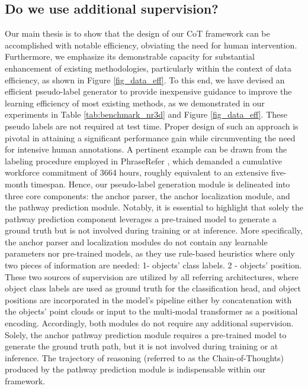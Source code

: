 \subsection{Do we use additional supervision?}

Our main thesis is to show that the design of our CoT framework can be accomplished with notable efficiency, obviating the need for human intervention. Furthermore, we emphasize its demonstrable capacity for substantial enhancement of existing methodologies, particularly within the context of data efficiency, as shown in Figure \ref{fig_data_eff}. To this end, we have devised an efficient pseudo-label generator to provide inexpensive guidance to improve the learning efficiency of most existing methods, as we demonstrated in our experiments in Table \ref{tab:benchmark_nr3d} and Figure \ref{fig_data_eff}. 
These pseudo labels are not required at test time.
Proper design of such an approach is pivotal in attaining a significant performance gain while circumventing the need for intensive human annotations.
A pertinent example can be drawn from the labeling procedure employed in PhraseRefer \citep{yuan2022toward}, which demanded a cumulative workforce commitment of 3664 hours, roughly equivalent to an extensive five-month timespan.
Hence, our pseudo-label generation module is delineated into three core components: the anchor parser, the anchor localization module, and the pathway prediction module. Notably, it is essential to highlight that solely the pathway prediction component leverages a pre-trained model to generate a ground truth but is not involved during training or at inference.
More specifically, the anchor parser and localization modules do not contain any learnable parameters nor pre-trained models, as they use rule-based heuristics where only two pieces of information are needed: 1- objects' class labels. 2 - objects' position. 
These two sources of supervision are utilized by all referring architectures, where object class labels are used as ground truth for the classification head, and object positions are incorporated in the model's pipeline either by concatenation with the objects' point clouds or input to the multi-modal transformer as a positional encoding. Accordingly, both modules do not require any additional supervision. 
Solely, the anchor pathway prediction module requires a pre-trained model to generate the ground truth path, but it is not involved during training or at inference.
The trajectory of reasoning (referred to as the Chain-of-Thoughts) produced by the pathway prediction module is indispensable within our framework. 
